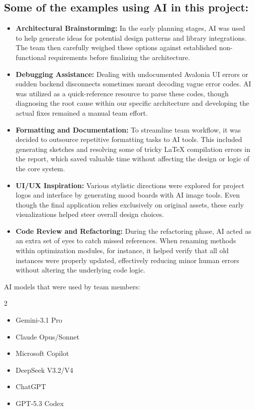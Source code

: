 \subsection*{Some of the examples using AI in this project:}
\begin{itemize}
    \item \textbf{Architectural Brainstorming:} In the early planning stages, AI was used to help generate ideas for potential design patterns and library integrations. The team then carefully weighed these options against established non-functional requirements before finalizing the architecture. 
    \item \textbf{Debugging Assistance:} Dealing with undocumented Avalonia UI errors or sudden backend disconnects sometimes meant decoding vague error codes. AI was utilized as a quick-reference resource to parse these codes, though diagnosing the root cause within our specific architecture and developing the actual fixes remained a manual team effort. 
    \item \textbf{Formatting and Documentation:} To streamline team workflow, it was decided to outsource repetitive formatting tasks to AI tools. This included generating sketches and resolving some of tricky LaTeX compilation errors in the report, which saved valuable time without affecting the design or logic of the core system. 
    \item \textbf{UI/UX Inspiration:} Various stylistic directions were explored for project logos and interface by generating mood boards with AI image tools. Even though the final application relies exclusively on original assets, these early visualizations helped steer overall design choices. 
    \item \textbf{Code Review and Refactoring:} During the refactoring phase, AI acted as an extra set of eyes to catch missed references. When renaming methods within optimization modules, for instance, it helped verify that all old instances were properly updated, effectively reducing minor human errors without altering the underlying code logic.
\end{itemize}

\noindent AI models that were used by team members: 
\begin{multicols} {2}
\begin{itemize} 
    \item Gemini-3.1 Pro
    \item Claude Opus/Sonnet
    \item Microsoft Copilot
    \item DeepSeek V3.2/V4
    \item ChatGPT
    \item GPT-5.3 Codex
\end{itemize}
\end {multicols}
